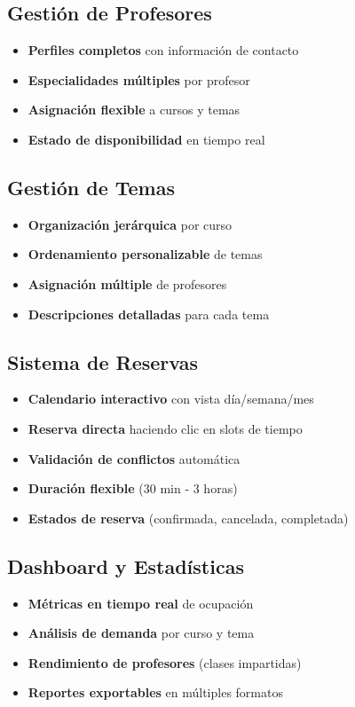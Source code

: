 \documentclass[12pt,a4paper]{article}
\begin{document}
\subsection{Gestión de Profesores}
\begin{itemize}
    \item \textbf{Perfiles completos} con información de contacto
    \item \textbf{Especialidades múltiples} por profesor
    \item \textbf{Asignación flexible} a cursos y temas
    \item \textbf{Estado de disponibilidad} en tiempo real
\end{itemize}

\subsection{Gestión de Temas}
\begin{itemize}
    \item \textbf{Organización jerárquica} por curso
    \item \textbf{Ordenamiento personalizable} de temas
    \item \textbf{Asignación múltiple} de profesores
    \item \textbf{Descripciones detalladas} para cada tema
\end{itemize}

\subsection{Sistema de Reservas}
\begin{itemize}
    \item \textbf{Calendario interactivo} con vista día/semana/mes
    \item \textbf{Reserva directa} haciendo clic en slots de tiempo
    \item \textbf{Validación de conflictos} automática
    \item \textbf{Duración flexible} (30 min - 3 horas)
    \item \textbf{Estados de reserva} (confirmada, cancelada, completada)
\end{itemize}

\subsection{Dashboard y Estadísticas}
\begin{itemize}
    \item \textbf{Métricas en tiempo real} de ocupación
    \item \textbf{Análisis de demanda} por curso y tema
    \item \textbf{Rendimiento de profesores} (clases impartidas)
    \item \textbf{Reportes exportables} en múltiples formatos
\end{itemize}
\end{document}
